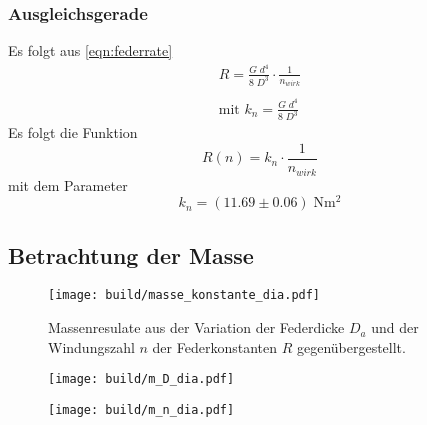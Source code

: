 \subsubsection{Ausgleichsgerade}

Es folgt aus \ref{eqn:federrate}
\begin{align*}
  R=\frac{G\;d^4}{8\;D^3}\cdot \frac{1}{n_{wirk}} \\\\  
  \text{mit } k_n=\frac{G\;d^4}{8\;D^3}
\end{align*}
Es folgt die Funktion
\begin{equation*}
  R(n)=k_n \cdot \frac{1}{n_{wirk}}
\end{equation*}
mit dem Parameter
\begin{equation*}
  k_n=(11.69 \pm 0.06) \;\si{\N\meter\squared}
\end{equation*}


\subsection{Betrachtung der Masse}
\begin{figure}[H]
  \center
  \texttt{[image: build/masse\_konstante\_dia.pdf]}
  \caption{Massenresulate aus der Variation der Federdicke $D_a$
          und der Windungszahl $n$ der Federkonstanten $R$ gegenübergestellt. }
\end{figure}
\begin{figure}[H]
  \center
  \texttt{[image: build/m\_D\_dia.pdf]}
  \caption{}
\end{figure}
\begin{figure}[H]
  \center
  \texttt{[image: build/m\_n\_dia.pdf]}
  \caption{}
\end{figure}

\label{sec:Auswertung}
